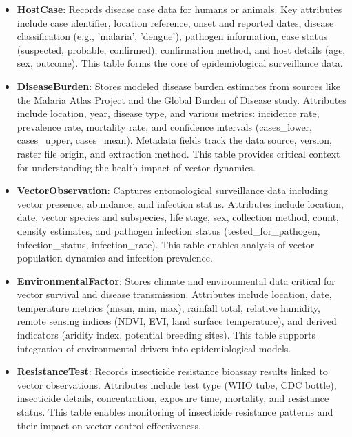 \documentclass{article}
\begin{document}
\begin{itemize}
    \item \textbf{HostCase}: Records disease case data for humans or animals. Key attributes include case identifier, 
    location reference, onset and reported dates, disease classification (e.g., 'malaria', 'dengue'), pathogen information, 
    case status (suspected, probable, confirmed), confirmation method, and host details (age, sex, outcome). This table forms 
    the core of epidemiological surveillance data.

    \item \textbf{DiseaseBurden}: Stores modeled disease burden estimates from sources like the Malaria Atlas Project and the 
    Global Burden of Disease study. Attributes include location, year, disease type, and various metrics: incidence rate, 
    prevalence rate, mortality rate, and confidence intervals (cases\_lower, cases\_upper, cases\_mean). Metadata fields track 
    the data source, version, raster file origin, and extraction method. This table provides critical context for understanding 
    the health impact of vector dynamics.

    \item \textbf{VectorObservation}: Captures entomological surveillance data including vector presence, abundance, and infection 
    status. Attributes include location, date, vector species and subspecies, life stage, sex, collection method, count, density 
    estimates, and pathogen infection status (tested\_for\_pathogen, infection\_status, infection\_rate). This table enables analysis 
    of vector population dynamics and infection prevalence.

    \item \textbf{EnvironmentalFactor}: Stores climate and environmental data critical for vector survival and disease transmission. 
    Attributes include location, date, temperature metrics (mean, min, max), rainfall total, relative humidity, remote sensing indices 
    (NDVI, EVI, land surface temperature), and derived indicators (aridity index, potential breeding sites). This table supports 
    integration of environmental drivers into epidemiological models.

    \item \textbf{ResistanceTest}: Records insecticide resistance bioassay results linked to vector observations. Attributes include 
    test type (WHO tube, CDC bottle), insecticide details, concentration, exposure time, mortality, and resistance status. This table 
    enables monitoring of insecticide resistance patterns and their impact on vector control effectiveness.
\end{itemize}
\end{document}
